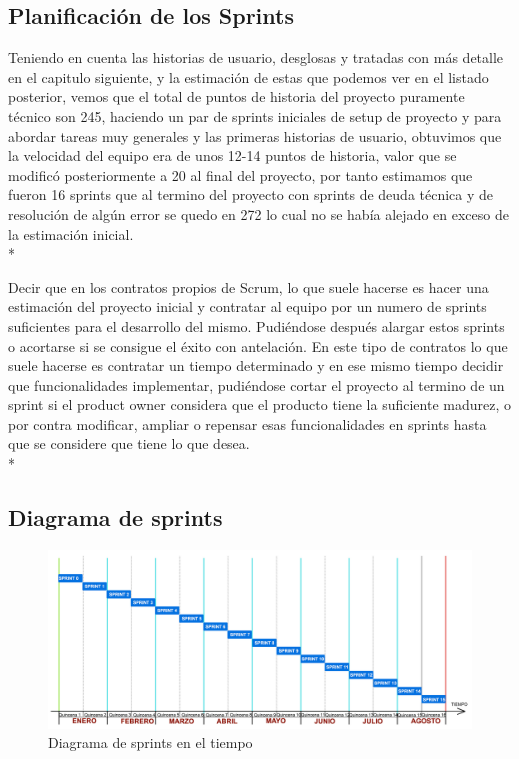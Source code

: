 \documentclass[../pfc.tex]{subfiles}
\begin{document}
	\subsection{Planificación de los Sprints}   
	
	Teniendo en cuenta las historias de usuario, desglosas y tratadas con más detalle en el capitulo siguiente, y la estimación de estas que podemos ver en el listado posterior, vemos que el total de puntos de historia del proyecto puramente técnico son 245, haciendo un par de sprints iniciales de setup de proyecto y para abordar tareas muy generales y las primeras historias de usuario, obtuvimos que la velocidad del equipo era de unos 12-14 puntos de historia, valor que se modificó posteriormente a 20 al final del proyecto, por tanto estimamos que fueron 16 sprints que al termino del proyecto con sprints de deuda técnica y de resolución de algún error se quedo en 272 lo cual no se había alejado en exceso de la estimación inicial. \\*
	
	Decir que en los contratos propios de Scrum, lo que suele hacerse es hacer una estimación del proyecto inicial y contratar al equipo por un numero de sprints suficientes para el desarrollo del mismo. Pudiéndose después alargar estos sprints o acortarse si se consigue el éxito con antelación. En este tipo de contratos lo que suele hacerse es contratar un tiempo determinado y en ese mismo tiempo decidir que funcionalidades implementar, pudiéndose cortar el proyecto al termino de un sprint si el product owner considera que el producto tiene la suficiente madurez, o por contra modificar, ampliar o repensar esas funcionalidades en sprints hasta que se considere que tiene lo que desea. \\*
	
	\clearpage
		
	\subsection{Diagrama de sprints}
	
	\begin{figure}[H]
		\centering
		\includegraphics[width=1\linewidth]{../images/gantt_b}
		\caption{Diagrama de sprints en el tiempo}
		\label{fig:diagramaer}
	\end{figure}
	
\end{document}
